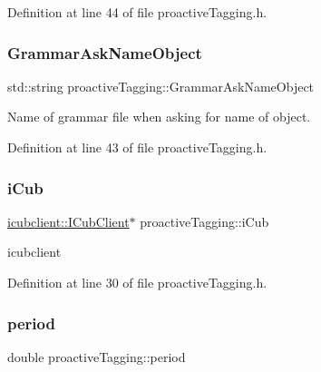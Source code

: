 Definition at line 44 of file proactive\+Tagging.\+h.

\mbox{\label{classproactiveTagging_a144b3a62457fae75af0950e223bfdb01}} 
\subsubsection{\texorpdfstring{Grammar\+Ask\+Name\+Object}{GrammarAskNameObject}}
{\footnotesize\ttfamily std\+::string proactive\+Tagging\+::\+Grammar\+Ask\+Name\+Object\hspace{0.3cm}{\ttfamily [protected]}}



Name of grammar file when asking for name of object. 



Definition at line 43 of file proactive\+Tagging.\+h.

\mbox{\label{classproactiveTagging_af0a6a3c8dd1504920ca362a55defadb2}} 
\subsubsection{\texorpdfstring{i\+Cub}{iCub}}
{\footnotesize\ttfamily \hyperlink{group__icubclient__clients_classicubclient_1_1ICubClient}{icubclient\+::\+I\+Cub\+Client}$\ast$ proactive\+Tagging\+::i\+Cub\hspace{0.3cm}{\ttfamily [protected]}}



icubclient 



Definition at line 30 of file proactive\+Tagging.\+h.

\mbox{\label{classproactiveTagging_a50ac9c7c0744e710bdcc51bd931a4b0e}} 
\subsubsection{\texorpdfstring{period}{period}}
{\footnotesize\ttfamily double proactive\+Tagging\+::period\hspace{0.3cm}{\ttfamily [protected]}}



